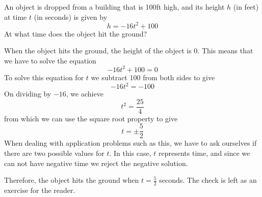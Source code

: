 \begin{myexample}
An object is dropped from a building that is 100ft high, and its height $h$ (in feet) at time $t$ (in seconds)
is given by
\[
	h = -16t^2+100
\] 
At what time does the object hit the ground?
\end{myexample}
\begin{myProof}
	When the object hits the ground, the height of the object is 0. This means that we have to solve the equation
	\[
		-16t^2+100 = 0
	\]
	To solve this equation for $t$ we subtract 100 from both sides to give
	\[
		-16t^2=-100
	\]
	On dividing by $-16$, we achieve
	\[
		t^2 = \frac{25}{4}
	\]
	from which we can use the square root property to give
	\[
		t = \pm \frac{5}{2}
	\]
	When dealing with application problems such as this, we have to ask ourselves if there are two possible
	values for $t$. In this case, $t$ represents time, and since we can not have negative time we reject the negative
	solution. 
		
	Therefore, the object hits the ground when $t=\frac{5}{2}$ seconds. The check is left as an exercise for the reader.
\end{myProof}
